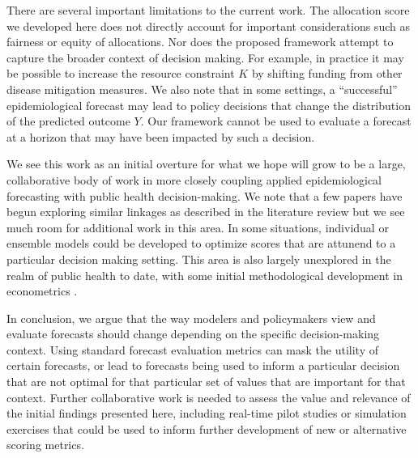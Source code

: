 \documentclass{article}\usepackage[]{graphicx}\usepackage[]{xcolor}
\begin{document}
There are several important limitations to the current work.
The allocation score we developed here does not directly account for important considerations such as fairness or equity of allocations.
Nor does the proposed framework attempt to capture the broader context of decision making. For example, in practice it may be possible to increase the resource constraint $K$ by shifting funding from other disease mitigation measures.
We also note that in some settings, a ``successful'' epidemiological forecast may lead to policy decisions that change the distribution of the predicted outcome $Y$. Our framework cannot be used to evaluate a forecast at a horizon that may have been impacted by such a decision.

We see this work as an initial overture for what we hope will grow to be a large, collaborative body of work in more closely coupling applied epidemiological forecasting with public health decision-making.
We note that a few papers have begun exploring similar linkages as described in the literature review \textendash but we see much room for additional work in this area.
In some situations, individual or ensemble models could be developed to optimize scores that are attunend to a particular decision making setting.
This area is also largely unexplored in the realm of public health to date, with some initial methodological development in econometrics \citep{loaiza-maya_focused_2021}.

In conclusion, we argue that the way modelers and policymakers view and evaluate forecasts should change depending on the specific decision-making context.
Using standard forecast evaluation metrics can mask the utility of certain forecasts, or lead to forecasts being used to inform a particular decision that are not optimal for that particular set of values that are important for that context.
Further collaborative work is needed to assess the value and relevance of the initial findings presented here, including real-time pilot studies or simulation exercises that could be used to inform further development of new or alternative scoring metrics.



\end{document}

